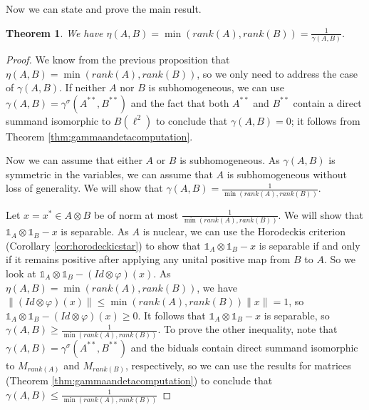 \documentclass[11pt]{article}
\newtheorem{theorem}{Theorem}
\numberwithin{theorem}{section}
\begin{document}
Now we can state and prove the main result. 
\begin{theorem}\label{thm: neighbrhood-norm relation}
We have $\eta(A,B) = \min(rank(A), rank(B)) = \frac{1}{\gamma(A,B)}$.
\end{theorem}
\begin{proof}
We know from the previous proposition that $\eta(A,B) = \min(rank(A), rank(B))$, so we only need to address the case of $\gamma(A,B)$. If neither $A$ nor $B$ is subhomogeneous, we can use $\gamma(A,B) = \gamma^{\sigma}(A^{\ast\ast}, B^{\ast\ast})$ and the fact that both $A^{\ast\ast}$ and $B^{\ast\ast}$ contain a direct summand isomorphic to $B(\ell^2)$ to conclude that $\gamma(A,B) = 0$; it follows from Theorem \ref{thm:gammaandetacomputation}.

Now we can assume that either $A$ or $B$ is subhomogeneous. As $\gamma(A,B)$ is symmetric in the variables, we can assume that $A$ is subhomogeneous without loss of generality. We will show that $\gamma(A,B) = \frac{1}{\min(rank(A), rank(B))}$.

Let $x=x^{\ast} \in A \otimes B$ be of norm at most $\frac{1}{\min(rank(A), rank(B))}$. We will show that $\mathds{1}_{A} \otimes \mathds{1}_{B} - x$ is separable. As $A$ is nuclear, we can use the Horodeckis criterion (Corollary \ref{cor:horodeckicstar}) to show that $\mathds{1}_{A} \otimes \mathds{1}_{B} - x$ is separable if and only if it remains positive after applying any unital positive map from $B$ to $A$. So we look at $\mathds{1}_{A} \otimes \mathds{1}_{B} - (Id \otimes \varphi)(x)$. As $\eta(A,B) = \min(rank(A), rank(B))$, we have $\|(Id \otimes \varphi)(x)\| \leqslant \min(rank(A),rank(B)) \|x\| = 1$, so $\mathds{1}_{A} \otimes \mathds{1}_{B} - (Id \otimes \varphi)(x) \geqslant 0$. It follows that $\mathds{1}_{A} \otimes \mathds{1}_{B} - x$ is separable, so $\gamma(A,B) \geqslant \frac{1}{\min(rank(A), rank(B))}$. To prove the other inequality, note that $\gamma(A,B) = \gamma^{\sigma}(A^{\ast\ast},B^{\ast\ast})$ and the biduals contain direct summand isomorphic to $M_{rank(A)}$ and $M_{rank(B)}$, respectively, so we can use the results for matrices (Theorem \ref{thm:gammaandetacomputation}) to conclude that $\gamma(A,B) \leqslant \frac{1}{\min(rank(A), rank(B))}$
\end{proof}
\end{document}
